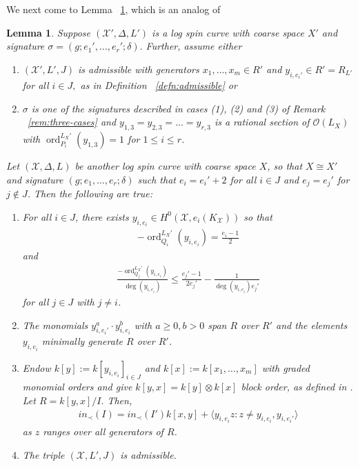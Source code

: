 \documentclass{amsart}
\theoremstyle{plain}
\newtheorem{lem}[thm]{Lemma}
\theoremstyle{definition}
\theoremstyle{remark}
\numberwithin{equation}{section}
\newcommand \sx{\mathscr X}
\newcommand\sco{{\mathscr O}}
\DeclareMathOperator{\ord}{ord}
\newcommand \subhalf[1]{\frac{{#1} - 1}{2{#1}}}
\newcommand \halfcan{L}
\begin{document}
We next come to Lemma ~\ref{lem:raise-stacky-order}, which is an
analog of ~\cite[Theorem 8.5.7]{vzb:stacky}

\begin{lem}
\label{lem:raise-stacky-order}
Suppose $(\sx', \Delta, \halfcan')$ is a log spin curve with coarse
space $X'$ and signature $\sigma = (g; e_1', \ldots, e_r'; \delta).$ Further, assume either 
\begin{enumerate}
	\item  $(\sx',\halfcan', J)$ is admissible with generators $x_1,\ldots, x_m \in R'$ and $y_{i, e_i'} \in R' = R_{L'}$ for all $i \in J,$ as in Definition ~\ref{defn:admissible} or
	\item $\sigma$ is one of the signatures described in cases (1), (2) and (3) of Remark ~\ref{rem:three-cases} and $y_{1, 3} = y_{2,3} = \ldots= y_{r,3}$ is a rational section of $\sco(\halfcan_X)$ with $\ord_{P_i}^{\halfcan_X'}(y_{1,3}) = 1$ for $1 \leq  i \leq r$.
\end{enumerate}
Let
$(\sx, \Delta, \halfcan)$ be another log spin curve
with coarse space $X$, so that $X \cong X'$ and signature $(g; e_1, \ldots, e_r;
\delta)$ such that $e_i = e_i' + 2$ for all $i \in J$ and
$e_j = e_j'$ for $j \notin J$. Then the following are true:
\begin{enumerate}
	\item[(a)] For all $i \in J$, there exists $y_{i, e_i} \in
		H^0(\sx, e_i(K_\sx))$ so that
		\begin{align*}
			-\ord_{Q_i}
^{\halfcan_X'}(y_{i, e_i}) = \frac{e_i - 1}{2}
		\end{align*}
		and
		\begin{align*}
			\frac{-\ord_{Q_j}
^{\halfcan_X'}(y_{i, e_i})}{\deg (y_{i, e_i})} \leq 
\subhalf{
			e_j'} - \frac{1}{\deg(y_{i, e_i})e_j'}
		\end{align*}
		for all $j \in J$ with $j \neq i$.
	\item[(b)] The monomials $y_{i, e_i'}^a \cdot y_{i, e_i}^b$ with $a \geq 
0,
		b > 0$ span $R$ over $R'$ and the elements $y_{i, e_i}$ minimally
		generate $R$ over $R'$.
	\item[(c)] Endow $k[y] := k[y_{i, e_i}]_{i \in J}$ and $k[x]:=k[x_1,\ldots, x_m]$ with graded monomial orders and give $k[y, x] = k[y] \otimes k[x]$ block order, as defined in \cite[Definition 8.1.1]{vzb:stacky}.  Let $R = k[y, x]/I.$ Then,
		\begin{align*}
			in_\prec(I) = in_\prec(I')k[x, y] + \langle y_{i, e_i}z : z 
			\neq y_{i, e_i}, y_{i, e_i'} \rangle
		\end{align*}
		as $z$ ranges over all generators of $R$.
	\item[(d)] The triple $(\sx, \halfcan', J)$ is admissible.
\end{enumerate}
\end{lem}
\end{document}

